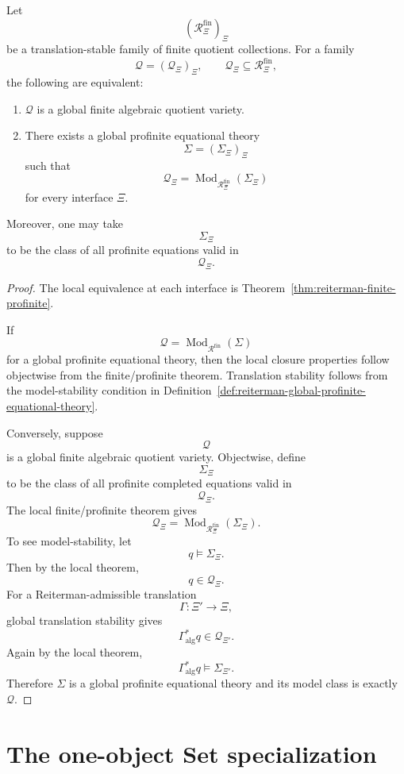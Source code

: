 \begin{theorem}
\label{thm:reiterman-global-finite-profinite}
Let
\[
(\mathcal R_\Xi^{\mathrm{fin}})_\Xi
\]
be a translation-stable family of finite quotient collections. For a family
\[
\mathcal Q=(\mathcal Q_\Xi)_\Xi,
\qquad
\mathcal Q_\Xi\subseteq\mathcal R_\Xi^{\mathrm{fin}},
\]
the following are equivalent:
\begin{enumerate}
\item \(\mathcal Q\) is a global finite algebraic quotient variety.
\item There exists a global profinite equational theory
\[
\Sigma=(\Sigma_\Xi)_\Xi
\]
such that
\[
\mathcal Q_\Xi
=
\operatorname{Mod}_{\mathcal R_\Xi^{\mathrm{fin}}}(\Sigma_\Xi)
\]
for every interface \(\Xi\).
\end{enumerate}
Moreover, one may take
\[
\Sigma_\Xi
\]
to be the class of all profinite equations valid in
\[
\mathcal Q_\Xi.
\]
\end{theorem}

\begin{proof}
The local equivalence at each interface is
Theorem~\ref{thm:reiterman-finite-profinite}.

If
\[
\mathcal Q
=
\operatorname{Mod}_{\mathcal R^{\mathrm{fin}}}(\Sigma)
\]
for a global profinite equational theory, then the local closure properties
follow objectwise from the finite/profinite theorem. Translation stability
follows from the model-stability condition in
Definition~\ref{def:reiterman-global-profinite-equational-theory}.

Conversely, suppose
\[
\mathcal Q
\]
is a global finite algebraic quotient variety. Objectwise, define
\[
\Sigma_\Xi
\]
to be the class of all profinite completed equations valid in
\[
\mathcal Q_\Xi.
\]
The local finite/profinite theorem gives
\[
\mathcal Q_\Xi
=
\operatorname{Mod}_{\mathcal R_\Xi^{\mathrm{fin}}}(\Sigma_\Xi).
\]
To see model-stability, let
\[
q\models\Sigma_\Xi.
\]
Then by the local theorem,
\[
q\in\mathcal Q_\Xi.
\]
For a Reiterman-admissible translation
\[
\Gamma:\Xi'\to\Xi,
\]
global translation stability gives
\[
\Gamma_{\mathrm{alg}}^\ast q\in\mathcal Q_{\Xi'}.
\]
Again by the local theorem,
\[
\Gamma_{\mathrm{alg}}^\ast q\models\Sigma_{\Xi'}.
\]
Therefore \(\Sigma\) is a global profinite equational theory and its model
class is exactly \(\mathcal Q\).
\end{proof}

\section{The one-object Set specialization}
\label{sec:reiterman-one-object-set}

